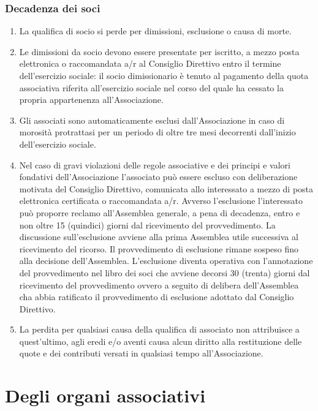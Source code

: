 \documentclass{djtsasddoc}
\begin{document}
	\section{Decadenza dei soci}
	\begin{enumerate}
		\item La qualifica di socio si perde per dimissioni,  esclusione o causa di morte.
		\item Le dimissioni da socio devono essere presentate per iscritto, a mezzo posta elettronica o raccomandata a/r al Consiglio Direttivo entro il termine dell'esercizio sociale: il socio dimissionario è tenuto al pagamento della quota  associativa riferita all'esercizio  sociale nel corso del quale ha cessato la propria appartenenza all'Associazione.
		\item Gli associati sono automaticamente esclusi  dall'Associazione in caso di morosità protrattasi per un periodo di oltre tre mesi  decorrenti dall'inizio dell'esercizio sociale.
		\item Nel caso di gravi violazioni delle regole associative e dei principi e valori fondativi dell'Associazione l'associato può essere escluso con deliberazione motivata del Consiglio Direttivo, comunicata allo interessato a mezzo di posta elettronica certificata o raccomandata a/r. Avverso l'esclusione  l'interessato può proporre reclamo  all'Assemblea generale, a pena di decadenza, entro e non oltre 15 (quindici) giorni dal ricevimento del provvedimento. La discussione sull'esclusione avviene alla prima Assemblea utile successiva al ricevimento del ricorso. Il provvedimento di esclusione rimane sospeso fino alla decisione dell'Assemblea. L'esclusione diventa operativa con l'annotazione del provvedimento nel libro dei soci che avviene decorsi  30 (trenta) giorni dal ricevimento del provvedimento ovvero a seguito di delibera dell'Assemblea cha abbia ratificato il provvedimento di esclusione adottato dal Consiglio Direttivo.
		\item La perdita per qualsiasi causa della qualifica di associato non attribuisce a quest'ultimo, agli eredi e/o aventi causa alcun diritto alla restituzione delle quote e dei contributi versati in qualsiasi tempo all'Associazione.
	\end{enumerate}
	
	\part{Degli organi associativi}
\end{document}
